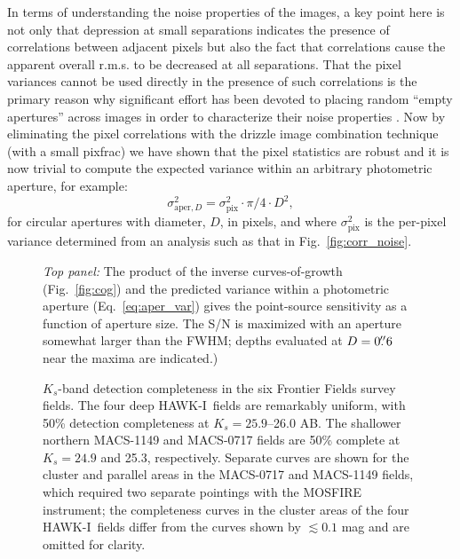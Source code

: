 \documentclass[preprint2]{aastex6}
\gdef\HAWKI{\mbox{HAWK-I}}
\begin{document}
In terms of understanding the noise properties of the images, a key point here is not only that depression at small separations indicates the presence of correlations between adjacent pixels but also the fact that correlations cause the apparent overall r.m.s. to be decreased at all separations.  That the pixel variances cannot be used directly in the presence of such correlations \citep{casertano:00} is the primary reason why significant effort has been devoted to placing random ``empty apertures'' across images in order to characterize their noise properties \citep[e.g.,][]{labbe:03,forster:06,quadri:musyc, whitaker:nmbs, skelton:14}.  Now by eliminating the pixel correlations with the drizzle image combination technique (with a small pixfrac) we have shown that the pixel statistics are robust and it is now trivial to compute the expected variance within an arbitrary photometric aperture, for example:
\begin{equation}
\sigma_{\mathrm{aper}, D}^2 = \sigma_\mathrm{pix}^2\cdot \pi/4 \cdot D^2,
\label{eq:aper_var}
\end{equation}
for circular apertures with diameter, $D$, in pixels, and where $\sigma_\mathrm{pix}^2$ is the per-pixel variance determined from an analysis such as that in Fig.~\ref{fig:corr_noise}.

\begin{figure}[!t]
\caption{\textit{Top panel:} The product of the inverse curves-of-growth (Fig.~\ref{fig:cog}) and the predicted variance within a photometric aperture (Eq.~\ref{eq:aper_var}) gives the point-source sensitivity as a function of aperture size.  The S/N is maximized with an aperture somewhat larger than the FWHM; depths evaluated at $D=0\mbox{$.\!\!^{\prime\prime}$}6$ near the maxima are indicated.)
\label{fig:depth}}  
\end{figure}

\begin{figure}[!t]
\caption{$K_s$-band detection completeness in the six Frontier Fields survey fields. The four deep \HAWKI\ fields are remarkably uniform, with 50\% detection completeness at $K_s=25.9$--26.0 AB.  The shallower northern MACS-1149 and MACS-0717 fields are 50\% complete at $K_s=24.9$ and 25.3, respectively.  Separate curves are shown for the cluster and parallel areas in the MACS-0717 and MACS-1149 fields, which required two separate pointings with the MOSFIRE instrument;  the completeness curves in the cluster areas of the four \HAWKI\ fields differ from the curves shown by $\lesssim0.1$ mag and are omitted for clarity.
\label{fig:completeness}}  
\end{figure}
\end{document}
